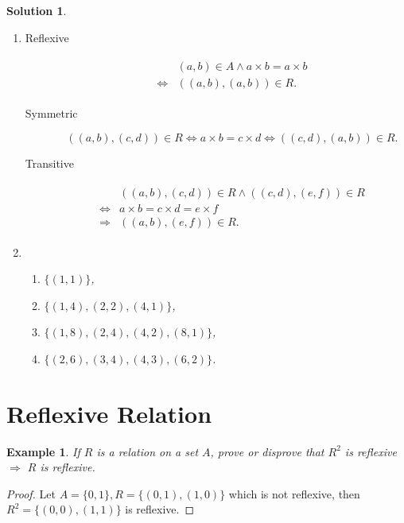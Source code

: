 \documentclass{../../cls/sig-alternate-05-2015}
\newtheorem{example}{Example}
\newtheorem*{solution*}{Solution}
\begin{document}
\begin{solution*}
	\begin{enumerate}[label=(\alph*)]
		\item \begin{description}
			\item[Reflexive] \begin{align}
				\begin{aligned}
                    & (a, b) \in A \land a \times b = a \times b\\
                    \Leftrightarrow & ((a, b), (a, b)) \in R.
                \end{aligned}
			\end{align}
			\item[Symmetric] \begin{equation}
				((a, b), (c, d)) \in R \Leftrightarrow a \times b = c \times d \Leftrightarrow ((c, d), (a, b)) \in R.
			\end{equation}
			\item[Transitive] \begin{align}
				\begin{aligned}
				& ((a, b), (c, d)) \in R \land ((c, d), (e, f)) \in R\\
				\Leftrightarrow & a \times b = c \times d = e \times f\\
				\Rightarrow & ((a, b), (e, f)) \in R.
				\end{aligned}
			\end{align}
		\end{description}
		\item \begin{enumerate}[label=(\roman*)]
			\item $\{(1, 1)\}$,
			\item $\{(1, 4), (2, 2), (4, 1)\}$,
			\item $\{(1, 8), (2, 4), (4, 2), (8, 1)\}$,
			\item $\{(2, 6), (3, 4), (4, 3), (6, 2)\}$.
		\end{enumerate}
	\end{enumerate}
\end{solution*}

\section{Reflexive Relation}
\begin{example}
	If $R$ is a relation on a set $A$, prove or disprove that $R^2$ is reflexive $\Rightarrow$ $R$ is reflexive.
\end{example}
\begin{proof}
	Let $A = \{0, 1\}, R = \{(0, 1), (1, 0)\}$ which is not reflexive, then $R^2 = \{(0, 0), (1, 1)\}$ is reflexive.
\end{proof}
\end{document}
